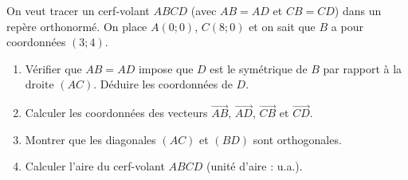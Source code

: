 \documentclass[11pt]{article}
\begin{document}
\begin{exercice}
On veut tracer un cerf-volant $ABCD$ (avec $AB = AD$ et $CB = CD$) dans un repère orthonormé. On place $A(0; 0)$, $C(8; 0)$ et on sait que $B$ a pour coordonnées $(3; 4)$.
\begin{enumerate}
    \item Vérifier que $AB = AD$ impose que $D$ est le symétrique de $B$ par rapport à la droite $(AC)$. Déduire les coordonnées de $D$.
    \item Calculer les coordonnées des vecteurs $\overrightarrow{AB}$, $\overrightarrow{AD}$, $\overrightarrow{CB}$ et $\overrightarrow{CD}$.
    \item Montrer que les diagonales $(AC)$ et $(BD)$ sont orthogonales.
    \item Calculer l'aire du cerf-volant $ABCD$ (unité d'aire : u.a.).
\end{enumerate}
\end{exercice}
\end{document}
